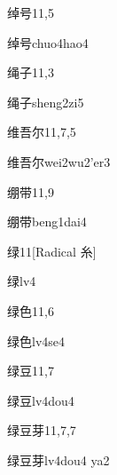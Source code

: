 \begin{entry}{绰号}{11,5}
  \begin{phonetics}{绰号}{chuo4hao4}
  \end{phonetics}
\end{entry}

\begin{entry}{绳子}{11,3}
  \begin{phonetics}{绳子}{sheng2zi5}
  \end{phonetics}
\end{entry}

\begin{entry}{维吾尔}{11,7,5}
  \begin{phonetics}{维吾尔}{wei2wu2'er3}
  \end{phonetics}
\end{entry}

\begin{entry}{绷带}{11,9}
  \begin{phonetics}{绷带}{beng1dai4}
  \end{phonetics}
\end{entry}

\begin{entry}{绿}{11}[Radical 糸]
  \begin{phonetics}{绿}{lv4}
  \end{phonetics}
\end{entry}

\begin{entry}{绿色}{11,6}
  \begin{phonetics}{绿色}{lv4se4}
  \end{phonetics}
\end{entry}

\begin{entry}{绿豆}{11,7}
  \begin{phonetics}{绿豆}{lv4dou4}
  \end{phonetics}
\end{entry}

\begin{entry}{绿豆芽}{11,7,7}
  \begin{phonetics}{绿豆芽}{lv4dou4 ya2}
  \end{phonetics}
\end{entry}

